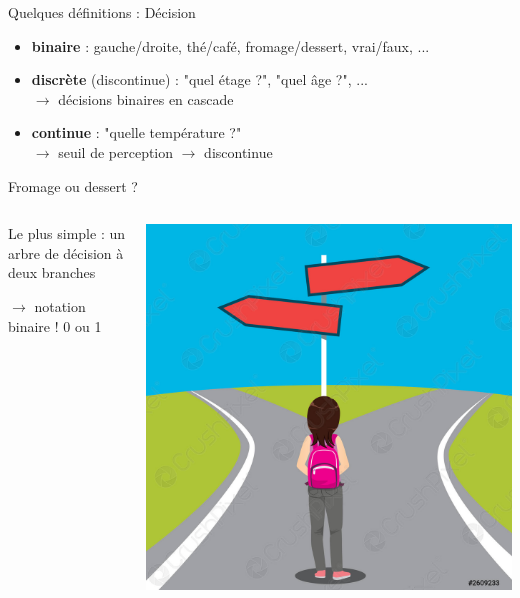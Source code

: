 \documentclass[9pt, aspectratio=169]{beamer}
\begin{document}
\begin{frame}{Quelques définitions : \og Décision \fg{}} %

\begin{itemize}
    \item \textbf{binaire} : gauche/droite, thé/café, fromage/dessert, vrai/faux, ...
    \item \textbf{discrète} (discontinue) : "quel étage ?", "quel âge ?", ... \\
    $\rightarrow$ décisions binaires en cascade
    \item \textbf{continue} : "quelle température ?" \\
    $\rightarrow$ seuil de perception $\rightarrow$ discontinue
\end{itemize}
\end{frame}

\begin{frame}{Fromage ou dessert ?} %
\begin{columns}
   \begin{column}{0.6\textwidth}
        Le plus simple : un arbre de décision à deux branches

        $\rightarrow$ notation binaire ! 0 ou 1
        
   \end{column}
   \begin{column}{0.39\textwidth}
		\includegraphics[width=\textwidth]{fig/choice_left_right.jpg}
   \end{column}
\end{columns}
\end{frame}
\end{document}
